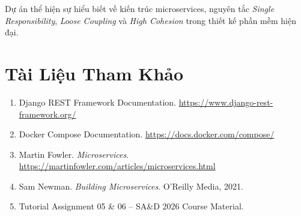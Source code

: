 \documentclass[12pt,a4paper]{article}
\begin{document}
Dự án thể hiện sự hiểu biết về kiến trúc microservices, nguyên tắc \textit{Single Responsibility}, \textit{Loose Coupling} và \textit{High Cohesion} trong thiết kế phần mềm hiện đại.

\newpage
\section*{Tài Liệu Tham Khảo}

\begin{enumerate}
  \item Django REST Framework Documentation. \url{https://www.django-rest-framework.org/}
  \item Docker Compose Documentation. \url{https://docs.docker.com/compose/}
  \item Martin Fowler. \textit{Microservices}. \url{https://martinfowler.com/articles/microservices.html}
  \item Sam Newman. \textit{Building Microservices}. O'Reilly Media, 2021.
  \item Tutorial Assignment 05 \& 06 -- SA\&D 2026 Course Material.
\end{enumerate}
\end{document}
